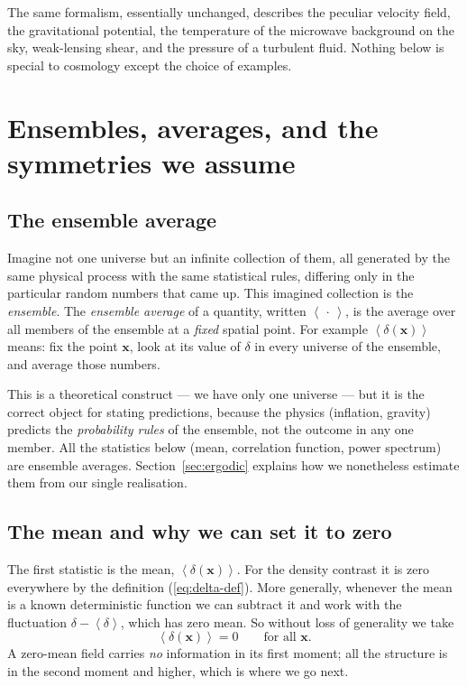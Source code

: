 \documentclass[12pt]{article}
\newcommand{\bx}{\mathbf{x}}
\newcommand{\avg}[1]{\left\langle #1 \right\rangle}
\begin{document}
The same formalism, essentially unchanged, describes the peculiar
velocity field, the gravitational potential, the temperature of the
microwave background on the sky, weak-lensing shear, and the pressure
of a turbulent fluid.  Nothing below is special to cosmology except the
choice of examples.

\section{Ensembles, averages, and the symmetries we assume}
\label{sec:ensemble}

\subsection{The ensemble average}
\label{sec:ensemble-avg}

Imagine not one universe but an infinite collection of them, all
generated by the same physical process with the same statistical rules,
differing only in the particular random numbers that came up.  This
imagined collection is the \emph{ensemble}.  The \emph{ensemble average}
of a quantity, written $\avg{\,\cdot\,}$, is the average over all members
of the ensemble at a \emph{fixed} spatial point.  For example
$\avg{\delta(\bx)}$ means: fix the point $\bx$, look at its value of
$\delta$ in every universe of the ensemble, and average those numbers.

This is a theoretical construct --- we have only one universe --- but it
is the correct object for stating predictions, because the physics
(inflation, gravity) predicts the \emph{probability rules} of the
ensemble, not the outcome in any one member.  All the statistics below
(mean, correlation function, power spectrum) are ensemble averages.
Section~\ref{sec:ergodic} explains how we nonetheless estimate them
from our single realisation.

\subsection{The mean and why we can set it to zero}

The first statistic is the mean, $\avg{\delta(\bx)}$.  For the density
contrast it is zero everywhere by the definition
(\ref{eq:delta-def}).  More generally, whenever the mean is a known
deterministic function we can subtract it and work with the
fluctuation $\delta - \avg{\delta}$, which has zero mean.  So without
loss of generality we take
\begin{equation}
  \avg{\delta(\bx)} = 0 \qquad \text{for all } \bx .
\end{equation}
A zero-mean field carries \emph{no} information in its first moment; all
the structure is in the second moment and higher, which is where we go
next.
\end{document}
